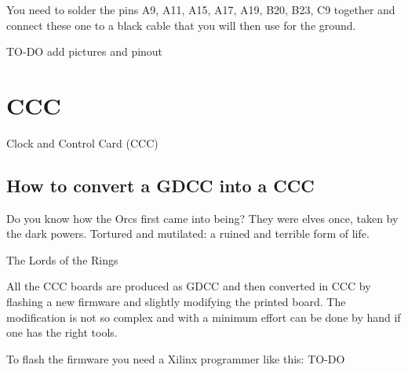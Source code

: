You need to solder the pins A9, A11, A15, A17, A19, B20, B23, C9 together and
connect these one to a black cable that you will then use for the ground.

TO-DO add pictures and pinout

\section{CCC}
Clock and Control Card (CCC)

\subsection{How to convert a GDCC into a CCC}
\epigraph{Do you know how the Orcs first came into being? They were elves once,
  taken by the dark powers. Tortured and mutilated: a ruined and terrible form
  of life.}{The Lords of the Rings} All the CCC boards are produced as GDCC and
then converted in CCC by flashing a new firmware and slightly modifying the
printed board. The modification is not so complex and with a minimum effort can
be done by hand if one has the right tools.

To flash the firmware you need a Xilinx programmer like this: TO-DO

